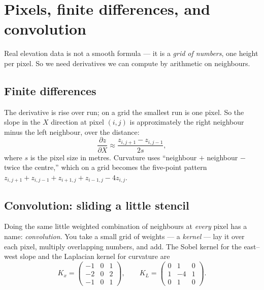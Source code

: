\documentclass[11pt,oneside]{book}
\begin{document}
\chapter{Pixels, finite differences, and convolution}

Real elevation data is not a smooth formula --- it is a \emph{grid of numbers}, one
height per pixel. So we need derivatives we can compute by arithmetic on neighbours.

\section{Finite differences}
The derivative is rise over run; on a grid the smallest run is one pixel. So the slope
in the $X$ direction at pixel $(i,j)$ is approximately the right neighbour minus the
left neighbour, over the distance:
\begin{equation}
\frac{\partial z}{\partial X}\approx\frac{z_{i,j+1}-z_{i,j-1}}{2s},
\end{equation}
where $s$ is the pixel size in metres. Curvature uses ``neighbour $+$ neighbour $-$
twice the centre,'' which on a grid becomes the five-point pattern
$z_{i,j+1}+z_{i,j-1}+z_{i+1,j}+z_{i-1,j}-4z_{i,j}$.

\section{Convolution: sliding a little stencil}
Doing the same little weighted combination of neighbours at \emph{every} pixel has a
name: \emph{convolution}. You take a small grid of weights --- a \emph{kernel} --- lay
it over each pixel, multiply overlapping numbers, and add. The Sobel kernel for the
east--west slope and the Laplacian kernel for curvature are
\begin{equation}
K_x=\begin{pmatrix}-1&0&1\\-2&0&2\\-1&0&1\end{pmatrix},\qquad
K_L=\begin{pmatrix}0&1&0\\1&-4&1\\0&1&0\end{pmatrix}.
\end{equation}

\begin{center}
\end{center}
\end{document}
